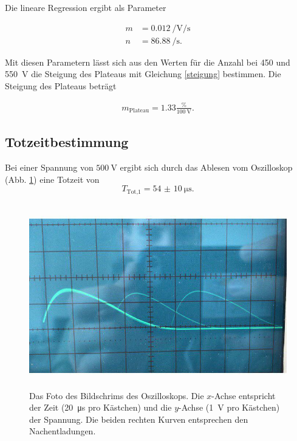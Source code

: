 \noindent Die lineare Regression ergibt als Parameter

\begin{align*} 
   m &= \SI{0.012}{\per\volt\per\second} \\
   n &= \SI{86.88}{\per\second}.
\end{align*}

\noindent Mit diesen Parametern lässt sich aus den Werten für die Anzahl bei \num{450} und \SI{550}{\volt} die Steigung des Plateaus mit Gleichung \eqref{steigung} bestimmen.
Die Steigung des Plateaus beträgt 

\begin{align*} 
    m_\text{Plateau} = \num{1.33} \frac{\si{\percent}}{\SI{100}{\volt}}.
\end{align*}

\subsection{Totzeitbestimmung}

Bei einer Spannung von $\SI{500}{\volt}$ ergibt sich durch das Ablesen vom Oszilloskop (Abb. \ref{foto}) eine Totzeit von 
\begin{equation*}
    T_\text{Tot,1} = \SI{54(10)}{\micro\second}.
\end{equation*}

\begin{figure}
    \centering
    \includegraphics[width=12cm, height=8cm]{build/foto.jpg}
    \caption{Das Foto des Bildschrims des Oszilloskops. Die $x$-Achse entspricht der Zeit (\SI{20}{\micro\second} pro Kästchen) und die $y$-Achse (\SI{1}{\volt} pro Kästchen) der Spannung. Die beiden rechten Kurven entsprechen den Nachentladungen.}
    \label{foto}
\end{figure}

